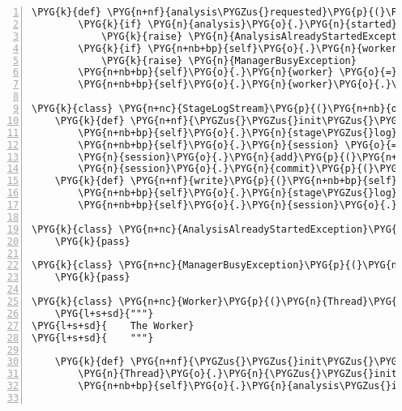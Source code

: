\begin{Verbatim}[commandchars=\\\{\},numbers=left,firstnumber=1,stepnumber=5]
    \PYG{k}{def} \PYG{n+nf}{analysis\PYGZus{}requested}\PYG{p}{(}\PYG{n+nb+bp}{self}\PYG{p}{,} \PYG{n}{analysis}\PYG{p}{,} \PYG{n}{re}\PYG{o}{=}\PYG{n+nb+bp}{False}\PYG{p}{)}\PYG{p}{:}
        \PYG{k}{if} \PYG{n}{analysis}\PYG{o}{.}\PYG{n}{started} \PYG{o+ow}{and} \PYG{o+ow}{not} \PYG{n}{re}\PYG{p}{:}
            \PYG{k}{raise} \PYG{n}{AnalysisAlreadyStartedException}
        \PYG{k}{if} \PYG{n+nb+bp}{self}\PYG{o}{.}\PYG{n}{worker}\PYG{o}{.}\PYG{n}{is\PYGZus{}alive}\PYG{p}{(}\PYG{p}{)}\PYG{p}{:}
            \PYG{k}{raise} \PYG{n}{ManagerBusyException}
        \PYG{n+nb+bp}{self}\PYG{o}{.}\PYG{n}{worker} \PYG{o}{=} \PYG{n}{Worker}\PYG{p}{(}\PYG{n}{analysis}\PYG{p}{)}
        \PYG{n+nb+bp}{self}\PYG{o}{.}\PYG{n}{worker}\PYG{o}{.}\PYG{n}{start}\PYG{p}{(}\PYG{p}{)}

\PYG{k}{class} \PYG{n+nc}{StageLogStream}\PYG{p}{(}\PYG{n+nb}{object}\PYG{p}{)}\PYG{p}{:}
    \PYG{k}{def} \PYG{n+nf}{\PYGZus{}\PYGZus{}init\PYGZus{}\PYGZus{}}\PYG{p}{(}\PYG{n+nb+bp}{self}\PYG{p}{,} \PYG{n}{analysis}\PYG{p}{,} \PYG{n}{stage}\PYG{p}{,} \PYG{n}{session}\PYG{p}{)}\PYG{p}{:}
        \PYG{n+nb+bp}{self}\PYG{o}{.}\PYG{n}{stage\PYGZus{}log} \PYG{o}{=} \PYG{n}{StageLog}\PYG{p}{(}\PYG{n}{analysis}\PYG{o}{=}\PYG{n}{analysis}\PYG{p}{,} \PYG{n}{stage}\PYG{o}{=}\PYG{n}{stage}\PYG{p}{,} \PYG{n}{text}\PYG{o}{=}\PYG{l+s}{"}\PYG{l+s}{"}\PYG{p}{)}
        \PYG{n+nb+bp}{self}\PYG{o}{.}\PYG{n}{session} \PYG{o}{=} \PYG{n}{session}
        \PYG{n}{session}\PYG{o}{.}\PYG{n}{add}\PYG{p}{(}\PYG{n+nb+bp}{self}\PYG{o}{.}\PYG{n}{stage\PYGZus{}log}\PYG{p}{)}
        \PYG{n}{session}\PYG{o}{.}\PYG{n}{commit}\PYG{p}{(}\PYG{p}{)}
    \PYG{k}{def} \PYG{n+nf}{write}\PYG{p}{(}\PYG{n+nb+bp}{self}\PYG{p}{,} \PYG{n}{data}\PYG{p}{)}\PYG{p}{:}
        \PYG{n+nb+bp}{self}\PYG{o}{.}\PYG{n}{stage\PYGZus{}log}\PYG{o}{.}\PYG{n}{text} \PYG{o}{+}\PYG{o}{=} \PYG{n}{data}
        \PYG{n+nb+bp}{self}\PYG{o}{.}\PYG{n}{session}\PYG{o}{.}\PYG{n}{commit}\PYG{p}{(}\PYG{p}{)}

\PYG{k}{class} \PYG{n+nc}{AnalysisAlreadyStartedException}\PYG{p}{(}\PYG{n+ne}{Exception}\PYG{p}{)}\PYG{p}{:}
    \PYG{k}{pass}

\PYG{k}{class} \PYG{n+nc}{ManagerBusyException}\PYG{p}{(}\PYG{n+ne}{Exception}\PYG{p}{)}\PYG{p}{:}
    \PYG{k}{pass}

\PYG{k}{class} \PYG{n+nc}{Worker}\PYG{p}{(}\PYG{n}{Thread}\PYG{p}{,} \PYG{n}{WorkerStages}\PYG{p}{)}\PYG{p}{:}
    \PYG{l+s+sd}{"""}
\PYG{l+s+sd}{    The Worker}
\PYG{l+s+sd}{    """}

    \PYG{k}{def} \PYG{n+nf}{\PYGZus{}\PYGZus{}init\PYGZus{}\PYGZus{}}\PYG{p}{(}\PYG{n+nb+bp}{self}\PYG{p}{,} \PYG{n}{analysis}\PYG{p}{)}\PYG{p}{:}
        \PYG{n}{Thread}\PYG{o}{.}\PYG{n}{\PYGZus{}\PYGZus{}init\PYGZus{}\PYGZus{}}\PYG{p}{(}\PYG{n+nb+bp}{self}\PYG{p}{)}
        \PYG{n+nb+bp}{self}\PYG{o}{.}\PYG{n}{analysis\PYGZus{}id} \PYG{o}{=} \PYG{n}{analysis}\PYG{o}{.}\PYG{n}{id}


\end{Verbatim}
